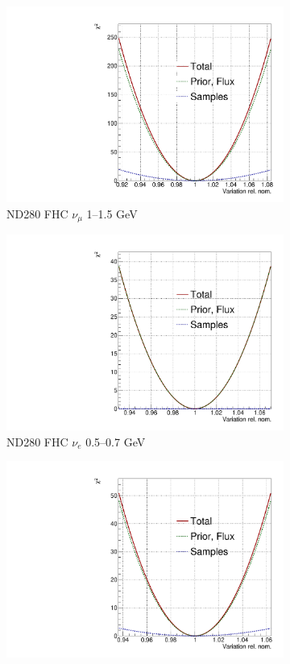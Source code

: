 \begin{figure}[!htbp]
\centering
\begin{subfigure}{.49\textwidth}
  \centering
  \includegraphics[width=0.7\linewidth]{figs/llh/b_5_llh.pdf}
  \caption{ND280 FHC $\nu_{\mu}$ 1--1.5 GeV}
\end{subfigure}
\begin{subfigure}{.49\textwidth}
  \centering
  \includegraphics[width=0.7\linewidth]{figs/llh/b_12_llh.pdf}
  \caption{ND280 FHC $\nu_{e}$ 0.5--0.7 GeV}
\end{subfigure}
\begin{subfigure}{.49\textwidth}
  \centering
  \includegraphics[width=0.7\linewidth]{figs/llh/b_36_llh.pdf}

\end{subfigure}
\end{figure}
